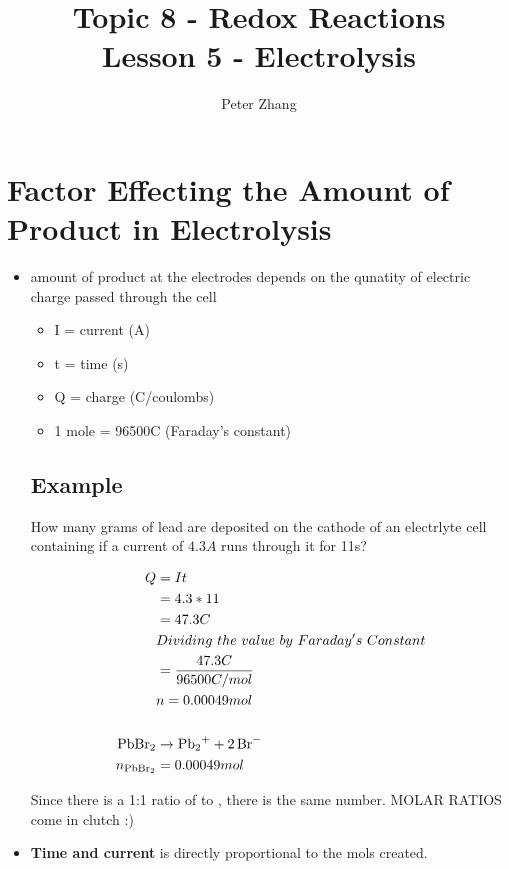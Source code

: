 \documentclass{article}
\title{Topic 8 - Redox Reactions\\Lesson 5 - Electrolysis}
\author{Peter Zhang}
\begin{document}
\maketitle
\tableofcontents
\newpage

\section{Factor Effecting the Amount of Product in Electrolysis}
\begin{itemize}
\item amount of product at the electrodes depends on the qunatity of electric charge passed through the cell

 \begin{itemize}\item I = current (A) \item t = time (s) \item Q = charge (C/coulombs) \item 1 mole = 96500C (Faraday's constant) \end{itemize}

\subsection{Example}
How many grams of lead are deposited on the cathode of an electrlyte cell containing  if a current of $4.3A$ runs through it for 11s?

\begin{align*}
Q&=It\\&=4.3*11\\
&=47.3C\\
&Dividing\ the\ value\ by\ Faraday's\ Constant\\
&=\frac{47.3C}{96500C/mol}\\
&n=0.00049mol\\
\\
\ce{PbBr2}&\rightarrow \ce{Pb2+ + 2Br-}\\
n_{\ce{PbBr2}} &= 0.00049mol
\end{align*}

Since there is a 1:1 ratio of  to , there is the same number. MOLAR RATIOS come in clutch :)

\item \textbf{Time and current} is directly proportional to the mols created.


\end{itemize}
\end{document}

